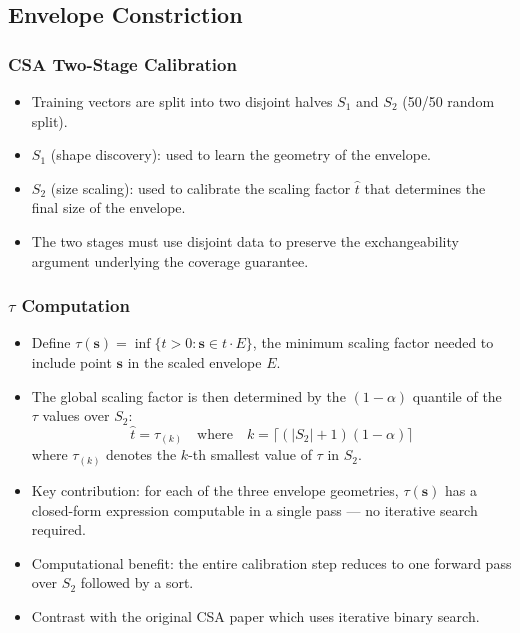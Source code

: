 \subsection{Envelope Constriction}

\subsubsection{CSA Two-Stage Calibration}
\begin{itemize}
    \item Training vectors are split into two disjoint halves $S_1$ and $S_2$ (50/50 random split).
    \item $S_1$ (shape discovery): used to learn the geometry of the envelope.
    \item $S_2$ (size scaling): used to calibrate the scaling factor $\hat{t}$ that determines the final size of the envelope.
    \item The two stages must use disjoint data to preserve the exchangeability argument underlying the coverage guarantee.
\end{itemize}

\subsubsection{\texorpdfstring{$\tau$ Computation}{tau Computation}}
\begin{itemize}
    \item Define $\tau(\mathbf{s}) = \inf\{t > 0 : \mathbf{s} \in t \cdot E\}$, the minimum scaling factor needed to include point $\mathbf{s}$ in the scaled envelope $E$.
    \item The global scaling factor is then determined by the $(1-\alpha)$ quantile of the $\tau$ values over $S_2$:
    \[
    \hat{t} = \tau_{(k)} \quad \text{where} \quad k = \lceil(|S_2|+1)(1-\alpha)\rceil
    \]
    where $\tau_{(k)}$ denotes the $k$-th smallest value of $\tau$ in $S_2$.
    \item Key contribution: for each of the three envelope geometries, $\tau(\mathbf{s})$ has a closed-form expression computable in a single pass — no iterative search required.
    \item Computational benefit: the entire calibration step reduces to one forward pass over $S_2$ followed by a sort.
    \item Contrast with the original CSA paper which uses iterative binary search.
\end{itemize}

